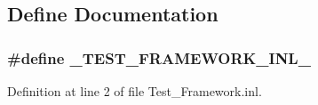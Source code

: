 \subsection{Define Documentation}
\hypertarget{Test__Framework_8inl_afc3cbb786f84afe13bc46da7b92f9050}{
\subsubsection[{\_\-TEST\_\-FRAMEWORK\_\-INL\_\-}]{\setlength{\rightskip}{0pt plus 5cm}\#define \_\-TEST\_\-FRAMEWORK\_\-INL\_\-}}
\label{d8/dca/Test__Framework_8inl_afc3cbb786f84afe13bc46da7b92f9050}


Definition at line 2 of file Test\_\-Framework.inl.

